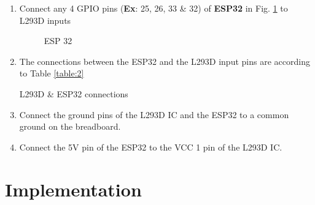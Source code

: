 \documentclass[conference]{IEEEtran}
\begin{document}
\begin{enumerate}[label=\thesection.\arabic*,ref=\thesection.\theenumi]
\item Connect any 4 GPIO pins (\textbf{Ex}: 25, 26, 33 \& 32) of \textbf{ESP32} in Fig. \ref{fig:esp32} to L293D inputs
\begin{figure}[!ht]
\centering
{}%
\caption{ESP 32}
\label{fig:esp32}
\end{figure}
\item The connections between the ESP32 and the L293D input pins are according to Table \ref{table:2}
\begin{table}[h!]
  \centering
  
  \caption{L293D \& ESP32 connections}
  \label{table:2}
\end{table}

\item Connect the ground pins of the L293D IC and the ESP32 to a common ground on the breadboard.  

\item Connect the 5V pin of the ESP32 to the VCC 1 pin of the L293D IC.  

\end{enumerate}
%
\section{Implementation}
\end{document}
